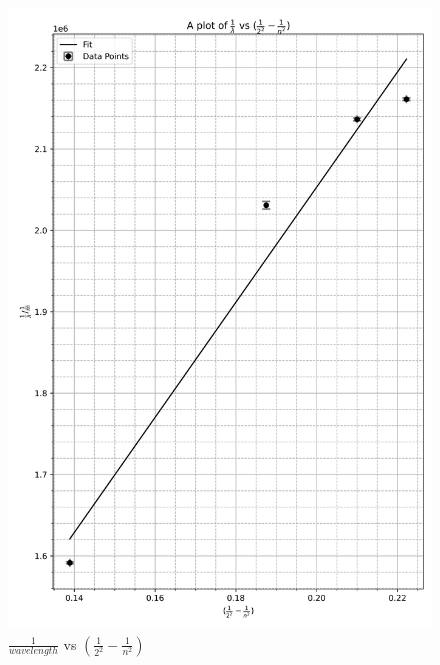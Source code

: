 \documentclass[12pt, a4paper]{article}
\begin{document}
\begin{figure}
    \centering
    \includegraphics[width = \textwidth]{l vs x.png}
    \caption{$\frac{1}{wavelength}$ vs $(\frac{1}{2^2}-\frac{1}{n^2})$}
    \label{fig:graph}
\end{figure}
\end{document}
